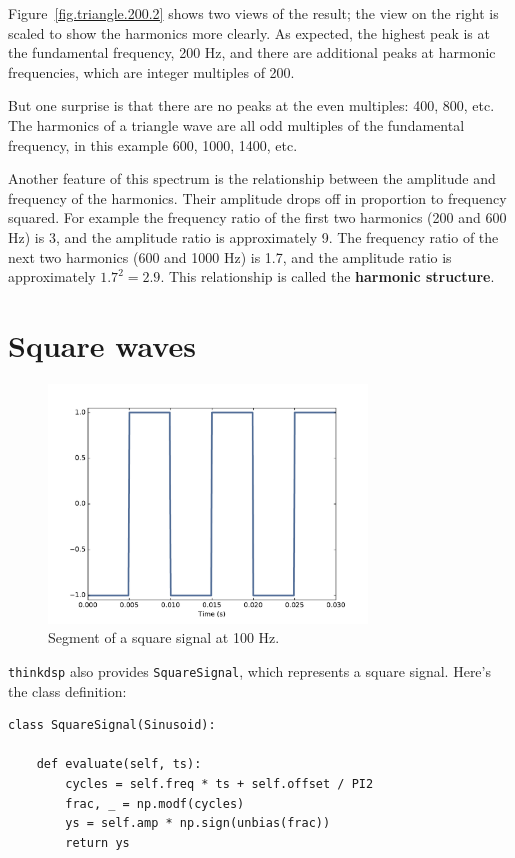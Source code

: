 \documentclass[12pt]{book}
\begin{document}
Figure~\ref{fig.triangle.200.2} shows two views of the result; the
view on the right is scaled to show the harmonics more clearly.  As
expected, the highest peak is at the fundamental frequency, 200 Hz,
and there are additional peaks at harmonic frequencies, which are
integer multiples of 200.

But one surprise is that there are no peaks at the even multiples:
400, 800, etc.  The harmonics of a triangle wave are all
odd multiples of the fundamental frequency, in this example
600, 1000, 1400, etc.

Another feature of this spectrum is the relationship between the
amplitude and frequency of the harmonics.  Their amplitude drops off
in proportion to frequency squared.  For example the frequency ratio
of the first two harmonics (200 and 600 Hz) is 3, and the amplitude
ratio is approximately 9.  The frequency ratio of the next two
harmonics (600 and 1000 Hz) is 1.7, and the amplitude ratio is
approximately $1.7^2 = 2.9$.  This relationship is called the
{\bf harmonic structure}.


\section{Square waves}
\label{square}

\begin{figure}
\centerline{\includegraphics[height=2.5in]{figs/square-100-1.pdf}}
\caption{Segment of a square signal at 100 Hz.}
\label{fig.square.100.1}
\end{figure}

{\tt thinkdsp} also provides {\tt SquareSignal}, which represents
a square signal.  Here's the class definition:

\begin{verbatim}
class SquareSignal(Sinusoid):
    
    def evaluate(self, ts):
        cycles = self.freq * ts + self.offset / PI2
        frac, _ = np.modf(cycles)
        ys = self.amp * np.sign(unbias(frac))
        return ys
\end{verbatim}
\end{document}
